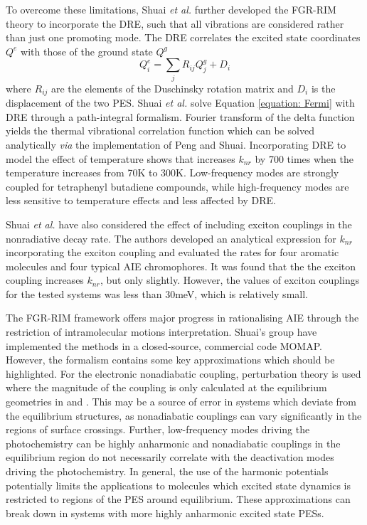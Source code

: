 To overcome these limitations, Shuai \textit{et al.} further developed the \ac{FGR-RIM} theory to incorporate the \ac{DRE}, such that all vibrations are considered rather than just one promoting mode.\cite{Yui2005,Peng2007a,Niu2010} The \ac{DRE} correlates the excited state coordinates $Q^{e}$ with those of the ground state $Q^{g}$
\begin{equation}
    Q^{e}_{i}=\sum_{j}R_{ij}Q^{g}_{j}+D_{i}
\end{equation}
where $R_{ij}$ are the elements of the Duschinsky rotation matrix and $D_{i}$ is the displacement of the two \ac{PES}. Shuai \textit{et al.} solve Equation \ref{equation: Fermi} with \ac{DRE} through a path-integral formalism.\cite{Peng2007a} Fourier transform of the delta function yields the thermal vibrational correlation function which can be solved analytically \textit{via} the implementation of Peng and Shuai.\cite{Peng2013}
Incorporating \ac{DRE} to model the effect of temperature shows that increases $k_{nr}$ by 700 times when the temperature increases from 70K to 300K.\cite{Peng2007} Low-frequency modes are strongly coupled for tetraphenyl butadiene compounds, while high-frequency modes are less sensitive to temperature effects and less affected by \ac{DRE}. 

Shuai \textit{et al.} have also considered the effect of including exciton couplings in the nonradiative decay rate.\cite{Li2017} The authors developed an analytical expression for $k_{nr}$ incorporating the exciton coupling and evaluated the rates for four aromatic molecules and four typical AIE chromophores. It was found that the the exciton coupling increases $k_{nr}$, but only slightly. However, the values of exciton couplings for the tested systems was less than 30meV, which is relatively small.

The \ac{FGR-RIM} framework offers major progress in rationalising AIE through the restriction of intramolecular motions interpretation. Shuai's group have implemented the methods in a closed-source, commercial code MOMAP.\cite{Niu2018} However, the formalism contains some key approximations which should be highlighted. For the electronic nonadiabatic coupling, perturbation theory is used where the magnitude of the coupling is only calculated at the equilibrium geometries in \szero{} and \sone{}. This may be a source of error in systems which deviate from the equilibrium structures, as nonadiabatic couplings can vary significantly in the regions of surface crossings. Further, low-frequency modes driving the photochemistry can be highly anharmonic and nonadiabatic couplings in the equilibrium region do not necessarily correlate with the deactivation modes driving the photochemistry. In general, the use of the harmonic potentials potentially limits the applications to molecules which excited state dynamics is restricted to regions of the PES around equilibrium. These approximations can break down in systems with more highly anharmonic excited state \acp{PES}. 
